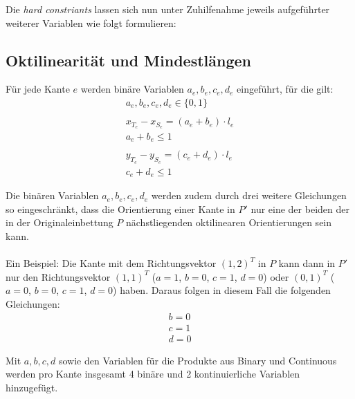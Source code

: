 \documentclass[a4paper,11pt]{amsart}
\begin{document}
\noindent Die \textit{hard constriants} lassen sich nun unter Zuhilfenahme jeweils aufgeführter weiterer Variablen wie folgt formulieren:

\subsection*{Oktilinearität und Mindestlängen}
Für jede Kante $e$ werden binäre Variablen $a_e, b_e, c_e, d_e$ eingeführt, für die gilt:
\bigskip
\begin{gather*}
a_e, b_e, c_e, d_e \in \{0, 1\}\\\\
x_{T_e} - x_{S_e} = (a_e + b_e) \cdot l_e\\
a_e + b_e \le 1\\\\
y_{T_e} - y_{S_e} = (c_e + d_e) \cdot l_e\\
c_e + d_e \le 1
\end{gather*}

\bigskip

\noindent Die binären Variablen $a_e, b_e, c_e, d_e$ werden zudem durch drei weitere Gleichungen so eingeschränkt, dass die Orientierung einer Kante in $P'$ nur eine der beiden der in der Originaleinbettung $P$ nächstliegenden oktilinearen Orientierungen sein kann.\\\\
Ein Beispiel: Die Kante mit dem Richtungsvektor $(1, 2)^T$ in $P$ kann dann in $P'$ nur den Richtungsvektor $(1, 1)^T$ ($a = 1$, $b = 0$, $c = 1$, $d = 0$) oder $(0, 1)^T$ ($a = 0$, $b = 0$, $c = 1$, $d = 0$) haben. Daraus folgen in diesem Fall die folgenden Gleichungen:
\bigskip
\begin{gather*}
b = 0\\
c = 1\\
d = 0
\end{gather*}

\bigskip
\noindent Mit $a, b, c, d$ sowie den Variablen für die Produkte aus Binary und Continuous werden pro Kante insgesamt 4 binäre und 2 kontinuierliche Variablen hinzugefügt.



\bigskip
\bigskip
\bigskip
\end{document}
